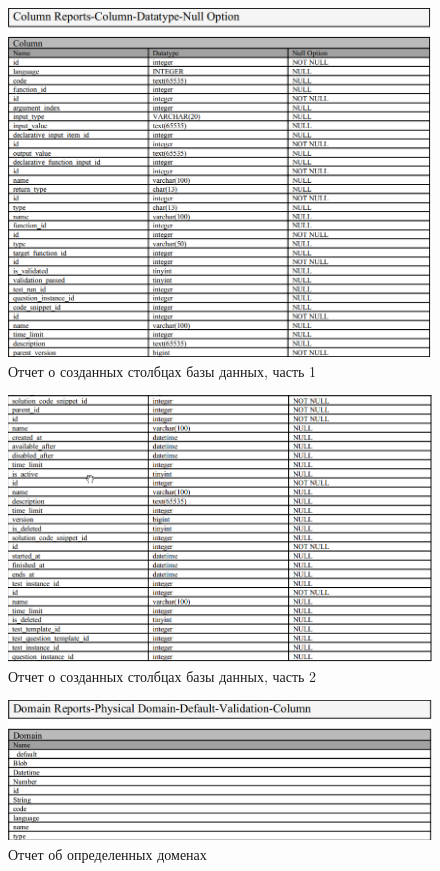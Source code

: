 \documentclass{article}
\begin{document}
\begin{figure}[H]
	\includegraphics[width=\textwidth, center]{ColumnReport_Part1.png}
	\caption{Отчет о созданных столбцах базы данных, часть 1}	
\end{figure}

\begin{figure}[H]
	\includegraphics[width=\textwidth, center]{ColumnReport_Part2.png}
	\caption{Отчет о созданных столбцах базы данных, часть 2}	
\end{figure}

\begin{figure}[H]
	\includegraphics[width=\textwidth, center]{DefinedDomains.png}
	\caption{Отчет об определенных доменах}
\end{figure}
\end{document}
